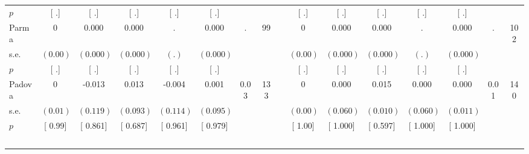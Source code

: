 \begin{longtable}{L{8em} c c c c c c c p{1em} c c c c c c c}
\quad \quad \quad \quad $ p$ & [        .] & [        .] & [        .] & [        .] & [        .] & & & & [        .] & [        .] & [        .] & [        .] & [        .] & &  \\[1em]
\quad \quad \quad Parma& 0 &     0.000 &     0.000 &         . &     0.000 &         . &        99 & & 0 &     0.000 &     0.000 &         . &     0.000 &         . &       102  \\*
\quad \quad \quad \quad s.e.& $ (     0.00)$ & $ (    0.000)$ & $ (    0.000)$ & $ (        .)$ & $ (    0.000)$ & & & & $ (     0.00)$ & $ (    0.000)$ & $ (    0.000)$ & $ (        .)$ & $ (    0.000)$ & &  \\*
\quad \quad \quad \quad $ p$ & [        .] & [        .] & [        .] & [        .] & [        .] & & & & [        .] & [        .] & [        .] & [        .] & [        .] & &  \\[1em]
\quad \quad \quad Padova& 0 &    -0.013 &     0.013 &    -0.004 &     0.001 &      0.03 &       133 & & 0 &     0.000 &     0.015 &     0.000 &     0.000 &      0.01 &       140  \\*
\quad \quad \quad \quad s.e.& $ (     0.01)$ & $ (    0.119)$ & $ (    0.093)$ & $ (    0.114)$ & $ (    0.095)$ & & & & $ (     0.00)$ & $ (    0.060)$ & $ (    0.010)$ & $ (    0.060)$ & $ (    0.011)$ & &  \\*
\quad \quad \quad \quad $ p$ & [     0.99] & [    0.861] & [    0.687] & [    0.961] & [    0.979] & & & & [     1.00] & [    1.000] & [    0.597] & [    1.000] & [    1.000] & &  \\[1em]
~\\[1em]
\end{longtable}